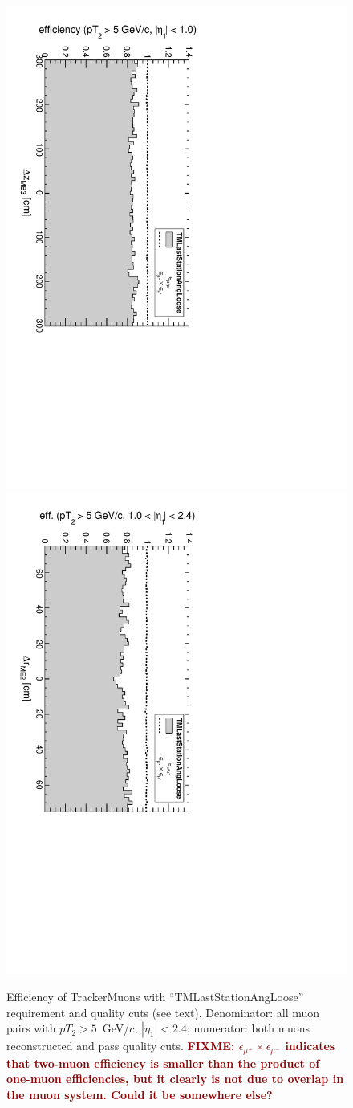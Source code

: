 \documentclass[12pt]{article}
\newcommand{\fixme}[1]{\textcolor{darkred}{\bf FIXME: #1}}
\begin{document}
\begin{figure}
\includegraphics[height=0.5\linewidth, angle=90]{fig/acceptance8_plot/vsmb3dz_TMLastStationAngLoose.pdf}
\includegraphics[height=0.5\linewidth, angle=90]{fig/acceptance8_plot/vsme2dr_TMLastStationAngLoose.pdf}

\caption{Efficiency of TrackerMuons with ``TMLastStationAngLoose'' requirement and quality cuts (see text).  Denominator: all muon pairs with $pT_2 > 5$~GeV/$c$, $|\eta_1| < 2.4$; numerator: both muons reconstructed and pass quality cuts. \fixme{$\epsilon_{\mu^+} \times \epsilon_{\mu^-}$ indicates that two-muon efficiency is smaller than the product of one-muon efficiencies, but it clearly is not due to overlap in the muon system.  Could it be somewhere else?} \label{fig:efficiencies_TMLastStationAngLoose}}
\end{figure}
\end{document}
